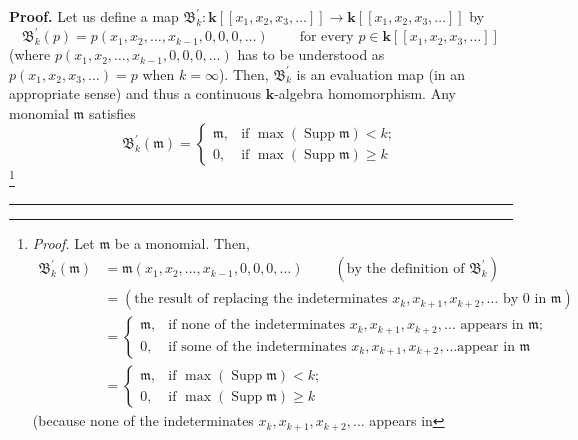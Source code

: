 \documentclass[numbers=enddot,12pt,final,onecolumn,notitlepage,abstracton]{scrartcl}%
\theoremstyle{definition}
\newenvironment{proof}[1][Proof]{\noindent\textbf{#1.} }{\ \rule{0.5em}{0.5em}}
\newenvironment{verlong}{}{}
\begin{document}
\begin{verlong}
\begin{proof}
Let us define a map $\mathfrak{B}_{k}^{\prime}:\mathbf{k}\left[  \left[
x_{1},x_{2},x_{3},\ldots\right]  \right]  \rightarrow\mathbf{k}\left[  \left[
x_{1},x_{2},x_{3},\ldots\right]  \right]  $ by%
\[
\mathfrak{B}_{k}^{\prime}\left(  p\right)  =p\left(  x_{1},x_{2}%
,\ldots,x_{k-1},0,0,0,\ldots\right)  \ \ \ \ \ \ \ \ \ \ \text{for every }%
p\in\mathbf{k}\left[  \left[  x_{1},x_{2},x_{3},\ldots\right]  \right]
\]
(where $p\left(  x_{1},x_{2},\ldots,x_{k-1},0,0,0,\ldots\right)  $ has to be
understood as $p\left(  x_{1},x_{2},x_{3},\ldots\right)  =p$ when $k=\infty$).
Then, $\mathfrak{B}_{k}^{\prime}$ is an evaluation map (in an appropriate
sense) and thus a continuous $\mathbf{k}$-algebra homomorphism. Any monomial
$\mathfrak{m}$ satisfies%
\begin{equation}
\mathfrak{B}_{k}^{\prime}\left(  \mathfrak{m}\right)  =
\begin{cases}
\mathfrak{m}, & \text{if }\max\left(  \operatorname*{Supp}\mathfrak{m}\right)
<k;\\
0, & \text{if }\max\left(  \operatorname*{Supp}\mathfrak{m}\right)  \geq k
\end{cases}
\label{pf.thm.tvidend.monom}%
\end{equation}
\footnote{\textit{Proof.} Let $\mathfrak{m}$ be a monomial. Then,%
\begin{align*}
\mathfrak{B}_{k}^{\prime}\left(  \mathfrak{m}\right)   &  =\mathfrak{m}\left(
x_{1},x_{2},\ldots,x_{k-1},0,0,0,\ldots\right)  \ \ \ \ \ \ \ \ \ \ \left(
\text{by the definition of }\mathfrak{B}_{k}^{\prime}\right) \\
&  =\left(  \text{the result of replacing the indeterminates }x_{k}%
,x_{k+1},x_{k+2},\ldots\text{ by }0\text{ in }\mathfrak{m}\right) \\
&  =
\begin{cases}
\mathfrak{m}, & \text{if none of the indeterminates }x_{k},x_{k+1}%
,x_{k+2},\ldots\text{ appears in }\mathfrak{m}\text{;}\\
0, & \text{if some of the indeterminates }x_{k},x_{k+1},x_{k+2},\ldots\text{
appear in }\mathfrak{m}%
\end{cases}
\\
&  =
\begin{cases}
\mathfrak{m}, & \text{if }\max\left(  \operatorname*{Supp}\mathfrak{m}\right)
<k;\\
0, & \text{if }\max\left(  \operatorname*{Supp}\mathfrak{m}\right)  \geq k
\end{cases}
\end{align*}
(because none of the indeterminates $x_{k},x_{k+1},x_{k+2},\ldots$ appears in
}
\end{proof}
\end{verlong}
\end{document}
